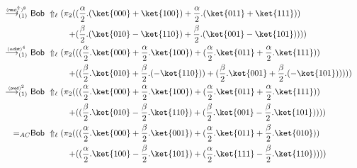 \documentclass[preprint]{elsarticle}
\newcommand\lra[1][1]{\longrightarrow_{\left(#1\right)}}
\newcommand\pair[2]{({#1}+{#2})}
\newcommand\npair[2]{({#1}-{#2})}
\newcommand\s[1]{\ensuremath{\mathsf{#1}}}
\newcommand\red[2][1]{\overset{\scriptscriptstyle\smash{#2}\vphantom{x}}{\lra[#1]}\ }
\newcommand\rprod{(\s{prod})}
\newcommand\rdists{(\s{\alpha dist})}
\newcommand\rcaneutr{(\s{neut^\Uparrow_r})}
\begin{document}
\begin{align*}
  \\
  \red{\rcaneutr^8} &
                      \begin{aligned}[t]
                        \s{Bob}\ \Uparrow_\ell(\pi_2 ( &\pair
                        {\frac{\alpha}2.\pair{\ket{000}}{\ket{100}}}
                        {\frac{\alpha}2.\pair{\ket{011}}{\ket{111}}}
                        \\
                        + &\pair {\frac{\beta}2.\npair{\ket{010}}{\ket{110}}}
                        {\frac{\beta}2.\npair{\ket{001}}{\ket{101}}} ) )
                      \end{aligned}
  \\
  \red{\rdists^4} &
                    \begin{aligned}[t]
                      \s{Bob}\ \Uparrow_\ell(\pi_2 ( &\pair
                      {\pair{\frac{\alpha}2.\ket{000}}{\frac{\alpha}2.\ket{100}}}
                      {\pair{\frac{\alpha}2.\ket{011}}{\frac{\alpha}2.\ket{111}}}
                      \\
                      + &\pair
                      {\pair{\frac{\beta}2.\ket{010}}{\frac{\beta}2.(-\ket{110})}}
                      {\pair{\frac{\beta}2.\ket{001}}{\frac{\beta}2.(-\ket{101})}}
                      ) )
                    \end{aligned}
  \\
  \red{\rprod^2} &
                   \begin{aligned}[t]
                     \s{Bob}\ \Uparrow_\ell(\pi_2 ( &\pair
                     {\pair{\frac{\alpha}2.\ket{000}}{\frac{\alpha}2.\ket{100}}}
                     {\pair{\frac{\alpha}2.\ket{011}}{\frac{\alpha}2.\ket{111}}}
                     \\
                     + &\pair
                     {\npair{\frac{\beta}2.\ket{010}}{\frac{\beta}2.\ket{110}}}
                     {\npair{\frac{\beta}2.\ket{001}}{\frac{\beta}2.\ket{101}}}
                     ) )
                   \end{aligned}
  \\
  =_{AC} &
           \begin{aligned}[t]
             \s{Bob}\ \Uparrow_\ell(\pi_2 (
             &\pair {\pair{\frac{\alpha}2.\ket{000}}{\frac{\beta}2.\ket{001}}} {\pair{\frac{\alpha}2.\ket{011}}{\frac{\beta}2.\ket{010}}} \\
             + &\pair
             {\npair{\frac{\alpha}2.\ket{100}}{\frac{\beta}2.\ket{101}}}
             {\npair{\frac{\alpha}2.\ket{111}}{\frac{\beta}2.\ket{110}}}))
           \end{aligned}
\end{align*}
\end{document}
